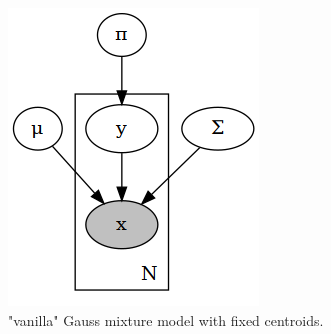 \documentclass[11pt, a4paper]{report}
\theoremstyle{plain}
\theoremstyle{definition}
\theoremstyle{remark}
\begin{document}
\begin{figure}[h]
\centering
\begin{subfigure}[b]{0.4\textwidth}
\includegraphics[width=\textwidth]{plots/mm.gv.png}
\caption{"vanilla" Gauss mixture model with fixed centroids.}
\label{fig:vanillamix}
\end{subfigure}
\begin{subfigure}[t]{0.4\textwidth}

\end{subfigure}
\end{figure}
\end{document}
